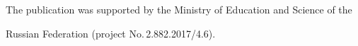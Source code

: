 









\Ack


\noindent


The publication was supported by the Ministry of Education and Science of the 


Russian Federation (project No.\,2.882.2017/4.6).
















